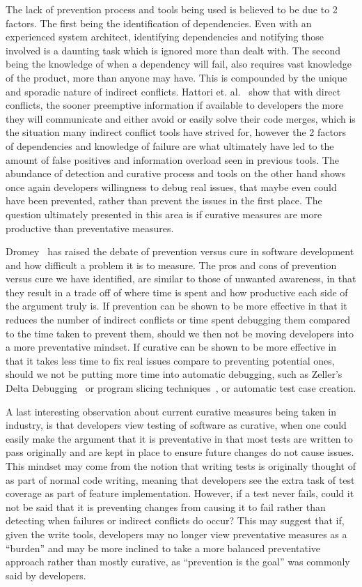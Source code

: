 \documentclass[conference]{IEEEtran}
\begin{document}
The lack of prevention process and tools being used is believed to be due to 2 factors. The first being the identification of dependencies.
Even with an experienced system architect, identifying dependencies and notifying those involved is a daunting task
which is ignored more than dealt with. The second being the knowledge of when a dependency will fail, also requires vast knowledge
of the product, more than anyone may have. This is compounded by the unique and sporadic nature of indirect conflicts.
Hattori et. al.~\cite{Hattori:2012:ICG} show that with direct conflicts, the
sooner preemptive information if available to developers the more they will communicate and either avoid or easily solve their code merges,
which is the situation many indirect conflict tools have strived for, however the 2 factors of dependencies and knowledge of failure
are what ultimately have led to the amount of false positives and information overload seen in previous tools. The
abundance of detection and curative process and tools on the other hand shows once again developers willingness to debug
real issues, that maybe even could have been prevented, rather than prevent the issues in the first place. The question ultimately
presented in this area is if curative measures are more productive than preventative measures.

Dromey~\cite{Dromey:2003} has raised the debate of prevention versus cure in software development and how difficult a problem it is
to measure. The pros and cons of prevention versus cure we have identified, are similar to those of unwanted awareness,
in that they result in a trade off
of where time is spent and how productive each side of the argument truly is. If prevention can be shown to be more effective in that
it reduces the number of indirect conflicts or time spent debugging them compared to the time taken to prevent them, should we then
not be moving developers into a more preventative mindset. If curative can be shown to be more effective in that it takes less time
to fix real issues compare to preventing potential ones, should we not be putting more time into automatic debugging, such as
Zeller's Delta Debugging~\cite{Zeller:2002:ICC} or program slicing techniques~\cite{Weiser:1982:PUS}, or automatic test case creation.

A last interesting observation about current curative measures being taken in industry, is that developers view testing of software
as curative, when one could easily make the argument that it is preventative in that most tests are written to pass originally and
are kept in place to ensure future changes do not cause issues. This mindset may come from the notion that writing tests is originally
thought of as part of normal code writing, meaning that developers see the extra task of test coverage as part of feature implementation.
However, if a test never fails, could it not be said that it is preventing changes from causing it to fail rather than detecting
when failures or indirect conflicts do occur? This may suggest that if, given the write tools, developers may no longer view preventative
measures as a ``burden'' and may be more inclined to take a more balanced preventative approach rather than mostly curative, as
``prevention is the goal'' was commonly said by developers.
\end{document}
